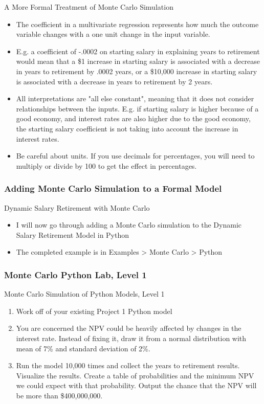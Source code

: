 \documentclass[handout, 11pt]{beamer}
\begin{document}
\begin{section}[Formal MC]{A More Formal Treatment of Monte Carlo Simulation}
\begin{frame}
\begin{itemize}
\small
\vfill
\item The coefficient in a multivariate regression represents how much the outcome variable changes with a one unit change in the input variable.
\vfill
\item E.g. a coefficient of -.0002 on starting salary in explaining years to retirement would mean that a \$1 increase in starting salary is associated with a decrease in years to retirement by .0002 years, or a \$10,000 increase in starting salary is associated with a decrease in years to retirement by 2 years.
\vfill
\item All interpretations are "all else constant", meaning that it does not consider relationships between the inputs. E.g. if starting salary is higher because of a good economy, and interest rates are also higher due to the good economy, the starting salary coefficient is not taking into account the increase in interest rates.
\vfill
\item Be careful about units. If you use decimals for percentages, you will need to multiply or divide by 100 to get the effect in percentages.
\end{itemize}
\end{frame}
\begin{frame}
\frametitle{Adding Monte Carlo Simulation to a Formal Model}
{
\begin{block}{Dynamic Salary Retirement with Monte Carlo}
\begin{itemize}
\item I will now go through adding a Monte Carlo simulation to the Dynamic Salary Retirement Model in Python
\item The completed example is in Examples > Monte Carlo > Python
\end{itemize}
\end{block}
}
\end{frame}
\begin{frame}
\frametitle{Monte Carlo Python Lab, Level 1}
{
\begin{block}{Monte Carlo Simulation of Python Models, Level 1}
\begin{enumerate}
\item Work off of your existing Project 1 Python model
\item You are concerned the NPV could be heavily affected by changes in the interest rate. Instead of fixing it, draw it from a normal distribution with mean of 7\% and standard deviation of 2\%.
\item Run the model 10,000 times and collect the years to retirement results. Visualize the results. Create a table of probabilities and the minimum NPV we could expect with that probability. Output the chance that the NPV will be more than \$400,000,000.

\end{enumerate}
\end{block}}
\end{frame}
\end{section}
\end{document}
